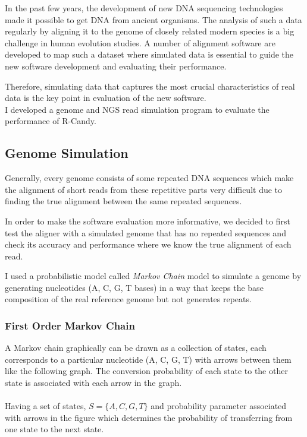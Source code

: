 \documentclass[11pt,a4paper]{report}
\begin{document}
In the past few years, the development of new DNA sequencing technologies made it possible to get DNA from ancient organisms.
The analysis of such a data regularly by aligning it to the genome of closely related modern species is a big challenge in human evolution studies.
A number of alignment software are developed to map such a dataset where simulated data is essential to guide the new software development and evaluating their performance.

Therefore, simulating data that captures the most crucial characteristics of real data is the key point in evaluation of the new software.\\

I developed a genome and NGS read simulation program to evaluate the performance of R-Candy.

\subsection{Genome Simulation}

Generally, every genome consists of some repeated DNA sequences which make the alignment of short reads from these repetitive parts very difficult due to finding the true alignment between the same repeated sequences.

In order to make the software evaluation more informative, we decided to first test the aligner with a simulated genome that has no repeated sequences and check its accuracy and performance where we know the true alignment of each read.

I used a probabilistic model called \emph{Markov Chain} model to 
simulate a genome by generating nucleotides (A, C, G, T bases) in a way that  keeps the base composition of the real reference genome but not generates repeats.


\subsubsection{First Order Markov Chain}
A Markov chain graphically can be drawn as a collection of states, 
each corresponds to a particular nucleotide (A, C, G, T) with arrows
between them like the following graph. 
The conversion probability of each state to the other state is 
associated with each arrow in the graph. 
\\\\ 
Having a set of states,  $ S= \{ A, C,  G, T \}$  and probability
parameter  associated with arrows in the figure which determines the
probability of transferring from one state to the next state.
\end{document}

